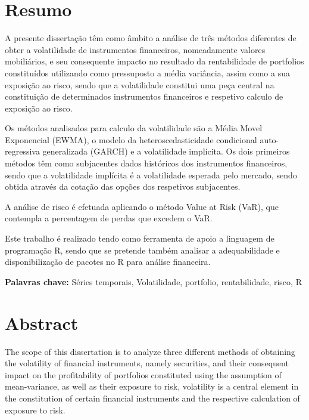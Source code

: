\documentclass[
  12pt,
  a4paper,
  openany]{book}
\begin{document}
\clearpage

\chapter*{Resumo}
\fontsize{12}{21}\selectfont
A presente dissertação têm como âmbito a análise de três métodos diferentes de obter a volatilidade de instrumentos financeiros, nomeadamente valores mobiliários, e seu consequente impacto no resultado da rentabilidade de portfolios constituídos utilizando como pressuposto a média variância, assim como a sua exposição ao risco, sendo que a volatilidade constitui uma peça central na constituição de determinados instrumentos financeiros e respetivo calculo de exposição ao risco.

Os métodos analisados para calculo da volatilidade são a Média Movel Exponencial (EWMA), o modelo da heteroscedasticidade condicional auto-regressiva generalizada (GARCH) e a volatilidade implícita. Os dois primeiros métodos têm como subjacentes dados históricos dos instrumentos financeiros, sendo que a volatilidade implícita é a volatilidade esperada pelo mercado, sendo obtida através da cotação das opções dos respetivos subjacentes.

A análise de risco é efetuada aplicando o método Value at Risk (VaR), que contempla a percentagem de perdas que excedem o VaR.

Este trabalho é realizado tendo como ferramenta de apoio a linguagem de programação R, sendo que se pretende também analisar a adequabilidade e disponibilização de pacotes no R para análise financeira.
\bigbreak

\noindent\textbf{Palavras chave:} Séries temporais, Volatilidade, portfolio, rentabilidade, risco, R



\setcounter{page}{2}

\chapter*{Abstract}
\fontsize{12}{21}\selectfont
The scope of this dissertation is to analyze three different methods of obtaining the volatility of financial instruments, namely securities, and their consequent impact on the profitability of portfolios constituted using the assumption of mean-variance, as well as their exposure to risk, volatility is a central element in the constitution of certain financial instruments and the respective calculation of exposure to risk.
\end{document}
